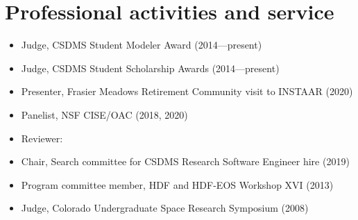 \section{Professional activities and service}
\vspace{0.5em}

\begin{itemize}

  \item Judge, CSDMS Student Modeler Award (2014---present)

  \item Judge, CSDMS Student Scholarship Awards (2014---present)

  \item Presenter, Frasier Meadows Retirement Community visit to
    INSTAAR (2020)

  \item Panelist, NSF CISE/OAC (2018, 2020)

  \item Reviewer:

  \item Chair, Search committee for CSDMS Research Software Engineer
    hire (2019)

  \item Program committee member, HDF and HDF-EOS Workshop XVI (2013)

  \item Judge, Colorado Undergraduate Space Research Symposium (2008)

\end{itemize}
